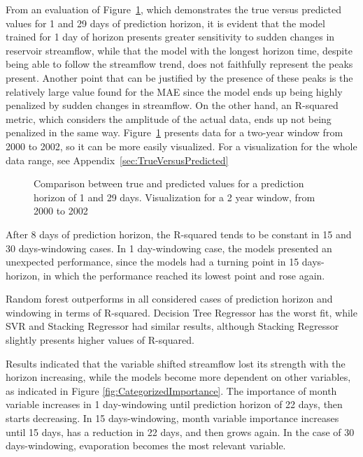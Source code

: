 \documentclass[12pt]{article}
\begin{document}
From an evaluation of Figure~\ref{fig:StackedComparisson}, which demonstrates the true versus predicted values for 1 and 29 days of prediction horizon, it is evident that the model trained for 1 day of horizon presents greater sensitivity to sudden changes in reservoir streamflow, while that the model with the longest horizon time, despite being able to follow the streamflow trend, does not faithfully represent the peaks present. Another point that can be justified by the presence of these peaks is the relatively large value found for the MAE since the model ends up being highly penalized by sudden changes in streamflow. On the other hand, an R-squared metric, which considers the amplitude of the actual data, ends up not being penalized in the same way. Figure~\ref{fig:StackedComparisson} presents data for a two-year window from 2000 to 2002, so it can be more easily visualized. For a visualization for the whole data range, see Appendix~\ref{sec:TrueVersusPredicted}

\begin{figure}[htbp]
    \centering
    
    \caption{Comparison between true and predicted values for a prediction     horizon of 1 and 29 days. Visualization for a 2 year window, from 2000 to 2002}
    \label{fig:StackedComparisson}
\end{figure}

After 8 days of prediction horizon, the R-squared tends to be constant in 15 and 30 days-windowing cases. In 1 day-windowing case, the models presented an unexpected performance, since the models had a turning point in 15 days-horizon, in which the performance reached its lowest point and rose again.

Random forest outperforms in all considered cases of prediction horizon and windowing in terms of R-squared. Decision Tree Regressor has the worst fit, while SVR and Stacking Regressor had similar results, although Stacking Regressor slightly presents higher values of R-squared.

Results indicated that the variable shifted streamflow lost its strength with the horizon increasing, while the models become more dependent on other variables, as indicated in Figure \ref{fig:CategorizedImportance}. The importance of month variable increases in 1 day-windowing until prediction horizon of 22 days, then starts decreasing. In 15 days-windowing, month variable importance increases until 15 days, has a reduction in 22 days, and then grows again. In the case of 30 days-windowing, evaporation becomes the most relevant variable.
\end{document}
